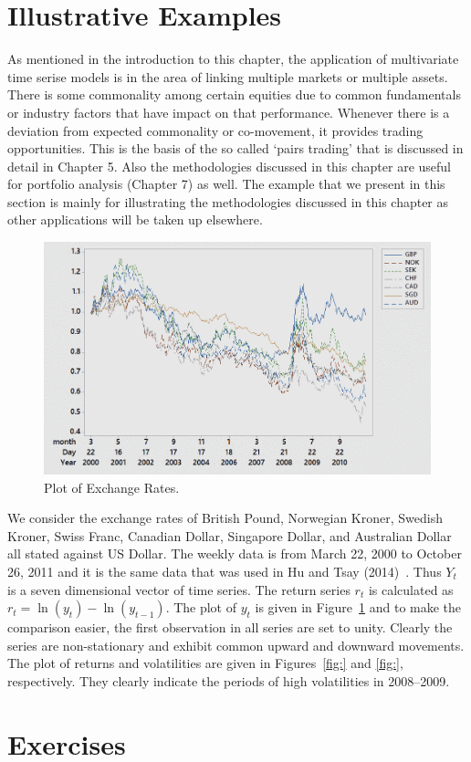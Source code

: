 \section{Illustrative Examples}


As mentioned in the introduction to this chapter, the application of multivariate time serise models is in the area of linking multiple markets or multiple assets. There is some commonality among certain equities due to common fundamentals or industry factors that have impact on that performance. Whenever there is a deviation from expected commonality or co-movement, it provides trading opportunities. This is the basis of the so called `pairs trading' that is discussed in detail in Chapter 5. Also the methodologies discussed in this chapter are useful for portfolio analysis (Chapter 7) as well. The example that we present in this section is mainly for illustrating the methodologies discussed in this chapter as other applications will be taken up elsewhere.

	\begin{figure}[!ht]
	\centering
	\includegraphics[width=\textwidth]{chapters/chapter_mvts/figures/exchangerates.png}
	\caption{Plot of Exchange Rates. \label{fig:exchrt}}
	\end{figure}


We consider the exchange rates of British Pound, Norwegian Kroner, Swedish Kroner, Swiss Franc, Canadian Dollar, Singapore Dollar, and Australian Dollar all stated against US Dollar. The weekly data is from March 22, 2000 to October 26, 2011 and it is the same data that was used in Hu and Tsay (2014)~\cite{hutsay14}. Thus $Y_t$ is a seven dimensional vector of time series. The return series $r_t$ is calculated as $r_t=\ln(y_t) - \ln(y_{t-1})$. The plot of $y_t$ is given in Figure~\ref{fig:exchrt} and to make the comparison easier, the first observation in all series are set to unity. Clearly the series are non-stationary and exhibit common upward and downward movements. The plot of returns and volatilities are given in Figures~\ref{fig:} and \ref{fig:}, respectively. They clearly indicate the periods of high volatilities in 2008--2009. 


\section{Exercises}













	
	


